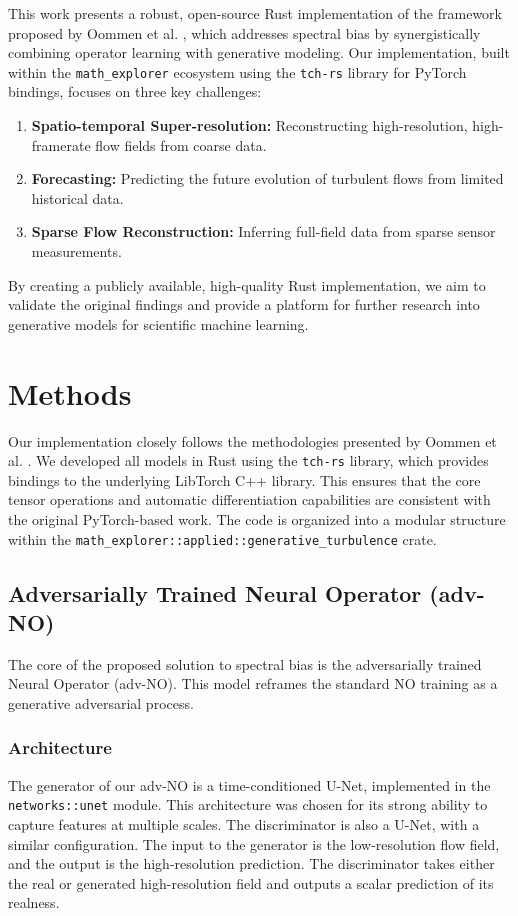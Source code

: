 \documentclass{article}
\begin{document}
This work presents a robust, open-source Rust implementation of the framework proposed by Oommen et al. \cite{oommen2025integrating}, which addresses spectral bias by synergistically combining operator learning with generative modeling. Our implementation, built within the \texttt{math_explorer} ecosystem using the \texttt{tch-rs} library for PyTorch bindings, focuses on three key challenges:
\begin{enumerate}
    \item \textbf{Spatio-temporal Super-resolution:} Reconstructing high-resolution, high-framerate flow fields from coarse data.
    \item \textbf{Forecasting:} Predicting the future evolution of turbulent flows from limited historical data.
    \item \textbf{Sparse Flow Reconstruction:} Inferring full-field data from sparse sensor measurements.
\end{enumerate}
By creating a publicly available, high-quality Rust implementation, we aim to validate the original findings and provide a platform for further research into generative models for scientific machine learning.

\section{Methods}
Our implementation closely follows the methodologies presented by Oommen et al. \cite{oommen2025integrating}. We developed all models in Rust using the \texttt{tch-rs} library, which provides bindings to the underlying LibTorch C++ library. This ensures that the core tensor operations and automatic differentiation capabilities are consistent with the original PyTorch-based work. The code is organized into a modular structure within the \texttt{math_explorer::applied::generative_turbulence} crate.

\subsection{Adversarially Trained Neural Operator (adv-NO)}
The core of the proposed solution to spectral bias is the adversarially trained Neural Operator (adv-NO). This model reframes the standard NO training as a generative adversarial process.

\subsubsection{Architecture}
The generator of our adv-NO is a time-conditioned U-Net, implemented in the \texttt{networks::unet} module. This architecture was chosen for its strong ability to capture features at multiple scales. The discriminator is also a U-Net, with a similar configuration. The input to the generator is the low-resolution flow field, and the output is the high-resolution prediction. The discriminator takes either the real or generated high-resolution field and outputs a scalar prediction of its realness.
\end{document}
